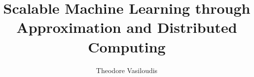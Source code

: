 


\title{Scalable Machine Learning through Approximation and Distributed Computing}
\author{Theodore Vasiloudis}


\dedication{
  To my parents
}


